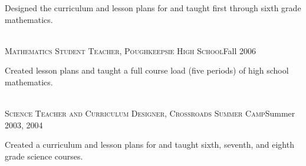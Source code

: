 \documentclass[10pt]{cv}
\begin{document}
\begin{llist}
\begin{minipage}[l]{0.7\textwidth}
Designed the curriculum and lesson plans for and taught first through sixth grade mathematics.\\
\end{minipage}\vspace{0.15cm}
\\
\textsc{Mathematics Student Teacher, Poughkeepsie High School}\hfill Fall 2006\\
\begin{minipage}[l]{0.7\textwidth}\vspace{0.15cm}
Created lesson plans and taught a full course load (five periods) of high school mathematics.\\
\end{minipage}\vspace{0.15cm}
\\
\textsc{Science Teacher and Curriculum Designer, Crossroads Summer Camp}\hfill Summer 2003, 2004 \\
\begin{minipage}[l]{0.7\textwidth}\vspace{0.15cm}
Created a curriculum and lesson plans for and taught sixth, seventh, and eighth grade science courses.
\end{minipage}\vspace{0.15cm}



%
\end{llist}
\end{document}
